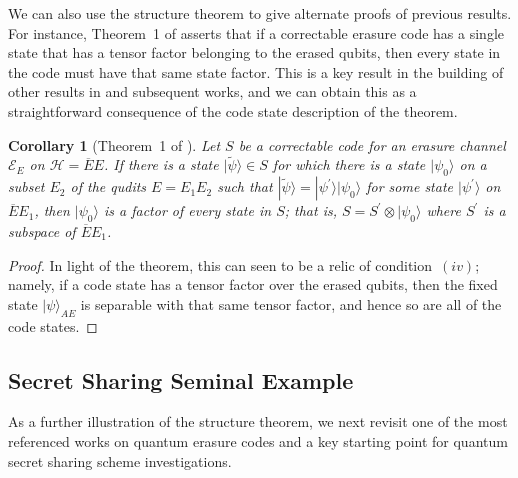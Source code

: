 \documentclass[11pt]{amsart}
\newtheorem{cor}[thm]{Corollary}
\theoremstyle{definition}
\theoremstyle{definition}
\theoremstyle{definition}
\newcommand{\1}{\mathbb{I}}
\def\ket#1{| #1 \rangle}
\begin{document}
We can also use the structure theorem to give alternate proofs of previous results. For instance, Theorem~1 of \cite{grassl1997codes} asserts that if a correctable erasure code has a single state that has a tensor factor belonging to the erased qubits, then every state in the code must have that same state factor. This is a key result in the building of other results in \cite{grassl1997codes} and subsequent works, and we can obtain this as a straightforward consequence of the code state description of the theorem. 

\begin{cor}[Theorem~1 of \cite{grassl1997codes}]
Let $S$ be a correctable code for an erasure channel $\mathcal E_E$ on $\mathcal H = \overline{E}E$. If there is a state $\ket{\widetilde{\psi}} \in S$ for which there is a state  $\ket{\psi_0}$ on a subset $E_2$ of the qudits $E=E_1E_2$ such that $\ket{\widetilde{\psi}} = \ket{\psi^\prime}\ket{\psi_0}$ for some state $\ket{\psi^\prime}$ on $\overline{E}E_1$, then $\ket{\psi_0}$ is a factor of every state in $S$; that is, $S = S^\prime \otimes \ket{\psi_0}$ where $S^\prime$ is a subspace of $\overline{E}E_1$. 
\end{cor}

\begin{proof} 
In light of the theorem, this can seen to be a relic of condition~$(iv)$; namely, if a code state has a tensor factor over the erased qubits, then the fixed state $\ket{\psi}_{AE}$ is separable with that same tensor factor, and hence so are all of the code states. 
\end{proof}

\subsection{Secret Sharing Seminal Example}

As a further illustration of the structure theorem, we next revisit one of the most referenced works on quantum erasure codes and a key starting point for quantum secret sharing scheme investigations. 
\end{document}

